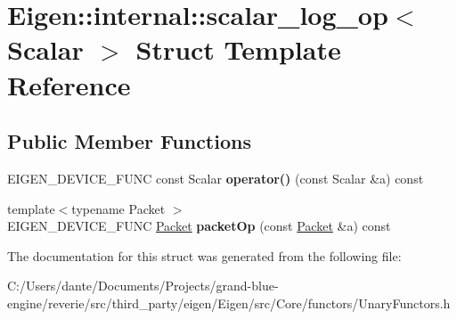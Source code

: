 \hypertarget{struct_eigen_1_1internal_1_1scalar__log__op}{}\section{Eigen\+::internal\+::scalar\+\_\+log\+\_\+op$<$ Scalar $>$ Struct Template Reference}
\label{struct_eigen_1_1internal_1_1scalar__log__op}
\subsection*{Public Member Functions}
\begin{DoxyCompactItemize}
\item 
\mbox{\label{struct_eigen_1_1internal_1_1scalar__log__op_a5a3bf7b2b930acc86457b63b664ee870}} 
E\+I\+G\+E\+N\+\_\+\+D\+E\+V\+I\+C\+E\+\_\+\+F\+U\+NC const Scalar {\bfseries operator()} (const Scalar \&a) const
\item 
\mbox{\label{struct_eigen_1_1internal_1_1scalar__log__op_a6328839017cffa9c646ac8843c1d318f}} 
{\footnotesize template$<$typename Packet $>$ }\\E\+I\+G\+E\+N\+\_\+\+D\+E\+V\+I\+C\+E\+\_\+\+F\+U\+NC \mbox{\hyperlink{union_eigen_1_1internal_1_1_packet}{Packet}} {\bfseries packet\+Op} (const \mbox{\hyperlink{union_eigen_1_1internal_1_1_packet}{Packet}} \&a) const
\end{DoxyCompactItemize}


The documentation for this struct was generated from the following file\+:\begin{DoxyCompactItemize}
\item 
C\+:/\+Users/dante/\+Documents/\+Projects/grand-\/blue-\/engine/reverie/src/third\+\_\+party/eigen/\+Eigen/src/\+Core/functors/Unary\+Functors.\+h\end{DoxyCompactItemize}
